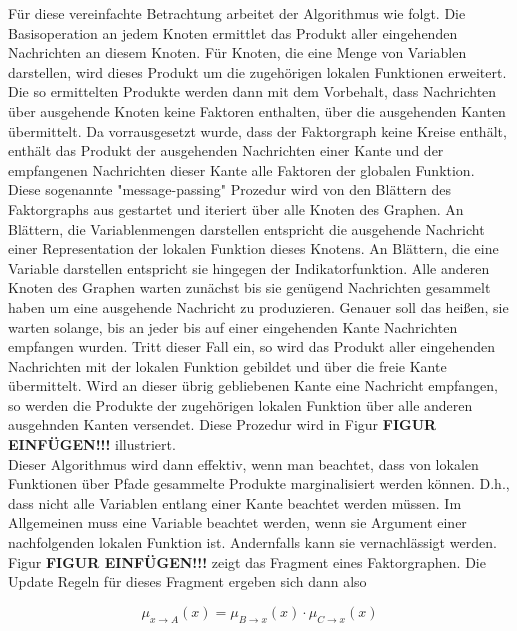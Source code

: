 \documentclass[12pt,a4paper]{scrartcl}
\numberwithin{equation}{section}
\begin{document}
Für diese vereinfachte Betrachtung arbeitet der Algorithmus wie folgt. Die Basisoperation an jedem Knoten ermittlet
das Produkt aller eingehenden Nachrichten an diesem Knoten. Für Knoten, die eine Menge von Variablen darstellen, wird dieses Produkt
um die zugehörigen lokalen Funktionen erweitert. Die so ermittelten Produkte werden dann mit dem Vorbehalt, dass
Nachrichten über ausgehende Knoten keine Faktoren enthalten, über die ausgehenden Kanten übermittelt. Da vorrausgesetzt
wurde, dass der Faktorgraph keine Kreise enthält, enthält das Produkt der ausgehenden Nachrichten einer Kante und der empfangenen
Nachrichten dieser Kante alle Faktoren der globalen Funktion. \\

Diese sogenannte "message-passing" Prozedur wird von den Blättern des Faktorgraphs aus gestartet und iteriert über alle
Knoten des Graphen. An Blättern, die Variablenmengen darstellen entspricht die ausgehende Nachricht einer Representation der lokalen 
Funktion dieses Knotens. An Blättern, die eine Variable darstellen entspricht sie hingegen der Indikatorfunktion.
Alle anderen Knoten des Graphen warten zunächst bis sie genügend Nachrichten gesammelt haben um eine ausgehende 
Nachricht zu produzieren. Genauer soll das heißen, sie warten solange, bis an jeder bis auf einer eingehenden Kante Nachrichten
empfangen wurden. Tritt dieser Fall ein, so wird das Produkt aller eingehenden Nachrichten mit der lokalen Funktion gebildet und über die freie Kante übermittelt.
Wird an dieser übrig gebliebenen Kante eine Nachricht empfangen, so werden die Produkte der zugehörigen lokalen Funktion über alle
anderen ausgehnden Kanten versendet. Diese Prozedur wird in Figur \textbf{FIGUR EINFÜGEN!!!} illustriert.\\

Dieser Algorithmus wird dann effektiv, wenn man beachtet, dass von lokalen Funktionen über Pfade gesammelte Produkte
marginalisiert werden können. D.h., dass nicht alle Variablen entlang einer Kante beachtet werden müssen. Im Allgemeinen
muss eine Variable beachtet werden, wenn sie Argument einer nachfolgenden lokalen Funktion ist. Andernfalls kann
sie vernachlässigt werden. \\

Figur \textbf{FIGUR EINFÜGEN!!!} zeigt das Fragment eines Faktorgraphen. Die Update Regeln für dieses Fragment ergeben sich dann also

\begin{equation}
 \mu_{x \rightarrow A}(x) = \mu_{B \rightarrow x}(x) \cdot \mu_{C \rightarrow x}(x)  
\end{equation}
\end{document}
